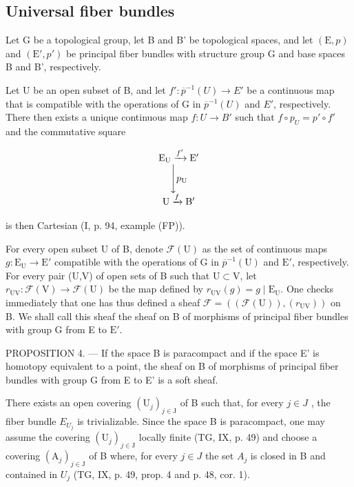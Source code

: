 \subsection{Universal fiber bundles}

Let G be a topological group, let B and B' be topological spaces, and let \((\mathrm{E}, p)\) and \((\mathrm{E}', p')\) be principal fiber bundles with structure group G and base spaces B and B', respectively.

Let U be an open subset of B, and let \(f'\colon \overline{p}^{-1}(U) \to E'\) be a continuous map that is compatible with the operations of G in \(\overline{p}^{-1}(U)\) and \(E'\), respectively. There then exists a unique continuous map \(f\colon U \to B'\) such that \(f \circ p_{U} = p' \circ f'\) and the commutative square

\[
\begin{array}{c} \mathrm {E_ {U}} \xrightarrow {f ^ {\prime}} \mathrm {E^ {\prime}} \\ \Biggl \downarrow p _ {\mathrm{U}} \\ \mathrm{U} \xrightarrow {f} \mathrm {B^ {\prime}} \end{array}
\]

is then Cartesian (I, p. 94, example (FP)).

For every open subset U of B, denote \(\mathcal{F}(\mathrm{U})\) as the set of continuous maps \(g\colon \mathrm{E}_{\mathrm{U}}\to \mathrm{E}'\) compatible with the operations of G in \(\overline{p}^{-1}(\mathrm{U})\) and \(\mathrm{E}'\), respectively. For every pair (U,V) of open sets of B such that \(\mathrm{U}\subset \mathrm{V}\), let \(r_{\mathrm{UV}}\colon \mathcal{F}(\mathrm{V})\to \mathcal{F}(\mathrm{U})\) be the map defined by \(r_{\mathrm{UV}}(g) = g\mid \mathrm{E}_{\mathrm{U}}\). One checks immediately that one has thus defined a sheaf \(\mathcal{F} = ((\mathcal{F}(\mathrm{U})),(r_{\mathrm{UV}}))\) on B. We shall call this sheaf the sheaf on B of morphisms of principal fiber bundles with group G from E to \(\mathrm{E}'\).

PROPOSITION 4. --- If the space B is paracompact and if the space E' is homotopy equivalent to a point, the sheaf on B of morphisms of principal fiber bundles with group G from E to E' is a soft sheaf.

There exists an open covering \((\mathrm{U}_{j})_{j\in\mathrm{J}}\) of B such that, for every \(j\in J\) , the fiber bundle \(E_{U_{j}}\) is trivializable. Since the space B is paracompact, one may assume the covering \((\mathrm{U}_{j})_{j\in\mathrm{J}}\) locally finite (TG, IX, p. 49) and choose a covering \((\mathrm{A}_{j})_{j\in\mathrm{J}}\) of B where, for every \(j\in J\) the set \(A_{j}\) is closed in B and contained in \(U_{j}\) (TG, IX, p. 49, prop. 4 and p. 48, cor. 1).

